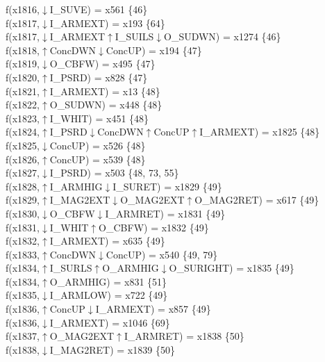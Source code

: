 f(x1816,$\downarrow$I\_SUVE) = x561 \{46\} \\  
f(x1817,$\downarrow$I\_ARMEXT) = x193 \{64\} \\  
f(x1817,$\downarrow$I\_ARMEXT$\uparrow$I\_SUILS$\downarrow$O\_SUDWN) = x1274 \{46\} \\  
f(x1818,$\uparrow$ConcDWN$\downarrow$ConcUP) = x194 \{47\} \\  
f(x1819,$\downarrow$O\_CBFW) = x495 \{47\} \\  
f(x1820,$\uparrow$I\_PSRD) = x828 \{47\} \\  
f(x1821,$\uparrow$I\_ARMEXT) = x13 \{48\} \\  
f(x1822,$\uparrow$O\_SUDWN) = x448 \{48\} \\  
f(x1823,$\uparrow$I\_WHIT) = x451 \{48\} \\  
f(x1824,$\uparrow$I\_PSRD$\downarrow$ConcDWN$\uparrow$ConcUP$\uparrow$I\_ARMEXT) = x1825 \{48\} \\  
f(x1825,$\downarrow$ConcUP) = x526 \{48\} \\  
f(x1826,$\uparrow$ConcUP) = x539 \{48\} \\  
f(x1827,$\downarrow$I\_PSRD) = x503 \{48, 73, 55\} \\  
f(x1828,$\uparrow$I\_ARMHIG$\downarrow$I\_SURET) = x1829 \{49\} \\  
f(x1829,$\uparrow$I\_MAG2EXT$\downarrow$O\_MAG2EXT$\uparrow$O\_MAG2RET) = x617 \{49\} \\  
f(x1830,$\downarrow$O\_CBFW$\downarrow$I\_ARMRET) = x1831 \{49\} \\  
f(x1831,$\downarrow$I\_WHIT$\uparrow$O\_CBFW) = x1832 \{49\} \\  
f(x1832,$\uparrow$I\_ARMEXT) = x635 \{49\} \\  
f(x1833,$\uparrow$ConcDWN$\downarrow$ConcUP) = x540 \{49, 79\} \\  
f(x1834,$\uparrow$I\_SURLS$\uparrow$O\_ARMHIG$\downarrow$O\_SURIGHT) = x1835 \{49\} \\  
f(x1834,$\uparrow$O\_ARMHIG) = x831 \{51\} \\  
f(x1835,$\downarrow$I\_ARMLOW) = x722 \{49\} \\  
f(x1836,$\uparrow$ConcUP$\downarrow$I\_ARMEXT) = x857 \{49\} \\  
f(x1836,$\downarrow$I\_ARMEXT) = x1046 \{69\} \\  
f(x1837,$\uparrow$O\_MAG2EXT$\uparrow$I\_ARMRET) = x1838 \{50\} \\  
f(x1838,$\downarrow$I\_MAG2RET) = x1839 \{50\} \\  
